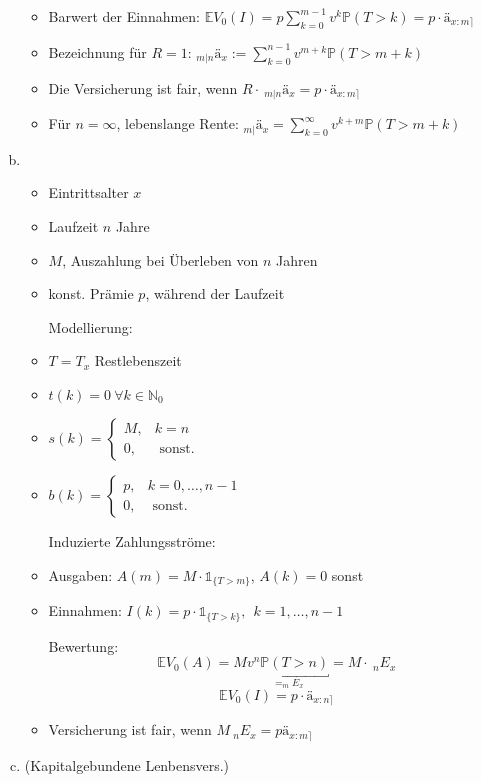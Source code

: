 \begin{enumerate}[(a)]
\begin{itemize}
		\item Barwert der Einnahmen: $\mathds{E}V_0(I)=p\sum_{k=0}^{m-1}v^k \mathds{P}(T>k)=p\cdot ä_{x:m\rceil}$ 
		\item Bezeichnung für $R=1$: $_{m|n}ä_x:=\sum_{k=0}^{n-1}v^{m+k}\mathds{P}(T>m+k)$
		\item Die Versicherung ist fair, wenn $R\cdot~ _{m|n}ä_x=p\cdot ä_{x:m\rceil}$
		\item Für $n=\infty$, lebenslange Rente: $_{m|}ä_x=\sum_{k=0}^{\infty}v^{k+m}\mathds{P}(T>m+k)$
	\end{itemize}
	\item {}\\
	\begin{itemize}
		\item Eintrittsalter $x$
		\item Laufzeit $n$ Jahre
		\item {} $M$, Auszahlung bei Überleben von $n$ Jahren
		\item konst. Prämie $p$, während der Laufzeit
		\item[Modellierung:]
		\item $T=T_x$ Restlebenszeit
		\item $t(k)=0~\forall k\in \mathds{N}_0$
		\item $s(k)=\left\{\begin{array}{cl} M, & k=n\\ 0, & \text{ sonst.} \end{array}\right.$
		\item $b(k)=\left\{\begin{array}{cl} p, & k=0,\dots,n-1 \\ 0, & \text{ sonst.}	\end{array}\right.$
		\item[Induzierte Zahlungsströme:]
		\item Ausgaben: $A(m)=M\cdot \mathbb{1}_{\{T>m\}}$, $A(k)=0$ sonst
		\item Einnahmen: $I(k)=p\cdot \mathbb{1}_{\{T>k\}},~~k=1,\dots,n-1$
		\item[Bewertung:]
		\[\mathds{E}V_0(A)= M \underbracket{v^n \mathds{P}(T>n)}_{= _mE_x}=M\cdot~_nE_x \]
		\[\mathds{E}V_0(I)= p\cdot ä_{x:n\rceil} \]
		\item Versicherung ist fair, wenn $ M~_nE_x=pä_{x:m\rceil}$
	\end{itemize}
	\item {} (Kapitalgebundene Lenbensvers.)\\
	

\end{enumerate}
